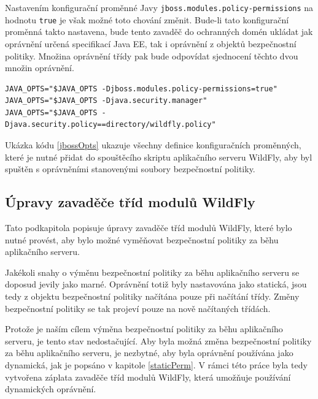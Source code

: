 Nastavením konfigurační proměnné Javy {\tt jboss.modules.policy-permissions} na hodnotu {\tt true} je však možné toto chování změnit.
Bude-li tato konfigurační proměnná takto nastavena, bude tento zavaděč do ochranných domén ukládat jak oprávnění určená specifikací Java EE, tak i oprávnění z objektů bezpečnostní politiky.
Množina oprávnění třídy pak bude odpovídat sjednocení těchto dvou množin oprávnění.
\cite{sourceModuleClassLoader}

\begin{lstlisting}[caption=Úprava spouštěcího skriptu pro spuštění se souborem bezpečnostní politiky, label=jbossOpts]
JAVA_OPTS="$JAVA_OPTS -Djboss.modules.policy-permissions=true"
JAVA_OPTS="$JAVA_OPTS -Djava.security.manager"
JAVA_OPTS="$JAVA_OPTS -Djava.security.policy==directory/wildfly.policy"
\end{lstlisting}

Ukázka kódu \ref{jbossOpts} ukazuje všechny definice konfiguračních proměnných, které je nutné přidat do spouštěcího skriptu aplikačního serveru WildFly,
aby byl spuštěn s oprávněními stanovenými soubory bezpečnostní politiky.

\subsection{Úpravy zavaděče tříd modulů WildFly} \label{zmenaZaBehu}

Tato podkapitola popisuje úpravy zavaděče tříd modulů WildFly, které bylo nutné provést, aby bylo možné vyměňovat bezpečnostní politiky za běhu aplikačního serveru.

Jakékoli snahy o výměnu bezpečnostní politiky za běhu aplikačního serveru se doposud jevily jako marné. Oprávnění totiž byly nastavována jako statická,
jsou tedy z objektu bezpečnostní politiky načítána pouze při načítání třídy. Změny bezpečnostní politiky se tak projeví pouze na nově načítaných třídách.

Protože je naším cílem výměna bezpečnostní politiky za běhu aplikačního serveru, je tento stav nedostačující.
Aby byla možná změna bezpečnostní politiky za běhu aplikačního serveru, je nezbytné, aby byla oprávnění používána jako dynamická, jak je popsáno v kapitole \ref{staticPerm}.
V rámci této práce byla tedy vytvořena záplata zavaděče tříd modulů WildFly, která umožňuje používání dynamických oprávnění.

